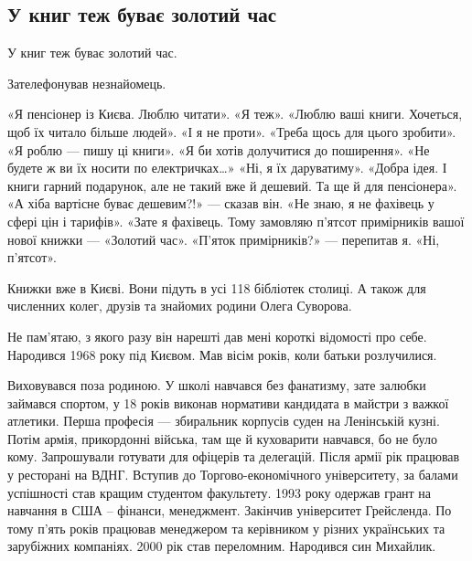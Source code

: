  
 
 

\subsection{У книг теж буває золотий час}
\label{sec:31_10_2020.fb.mido_mukachevo.1.knigi}


У книг теж буває золотий час.

Зателефонував незнайомець.

«Я пенсіонер із Києва. Люблю читати».
«Я теж».
«Люблю ваші книги. Хочеться, щоб їх читало більше людей».
«І я не проти».
«Треба щось для цього зробити».
«Я роблю --- пишу ці книги».
«Я би хотів долучитися до поширення».
«Не будете ж ви їх носити по електричках…»
«Ні, я їх даруватиму».
«Добра ідея. І книги гарний подарунок, але не такий вже й дешевий. Та ще й для пенсіонера».
«А хіба вартісне буває дешевим?!» --- сказав він.
«Не знаю, я не фахівець у сфері цін і тарифів».
«Зате я фахівець. Тому замовляю п’ятсот примірників вашої нової книжки --- «Золотий час».
«П’яток примірників?» --- перепитав я.
«Ні, п’ятсот».

Книжки вже в Києві. Вони підуть в усі 118 бібліотек столиці. А також для
численних колег, друзів та знайомих родини Олега Суворова.

Не пам’ятаю, з якого разу він нарешті дав мені короткі відомості про себе.
Народився 1968 року під Києвом. Мав вісім років, коли батьки розлучилися.

Виховувався поза родиною. У школі навчався без фанатизму, зате залюбки займався
спортом, у 18 років виконав нормативи кандидата в майстри з важкої атлетики.
Перша професія --- збиральник корпусів суден на Ленінській кузні.  Потім армія,
прикордонні війська, там ще й куховарити навчався, бо не було кому. Запрошували
готувати для офіцерів та делегацій. Після армії рік працював у ресторані на
ВДНГ. Вступив до Торгово-економічного університету, за балами успішності став
кращим студентом факультету. 1993 року одержав грант на навчання в США –
фінанси, менеджмент. Закінчив університет Грейсленда. По тому п’ять років
працював менеджером та керівником у різних українських та зарубіжних компаніях.
2000 рік став переломним. Народився син Михайлик.

